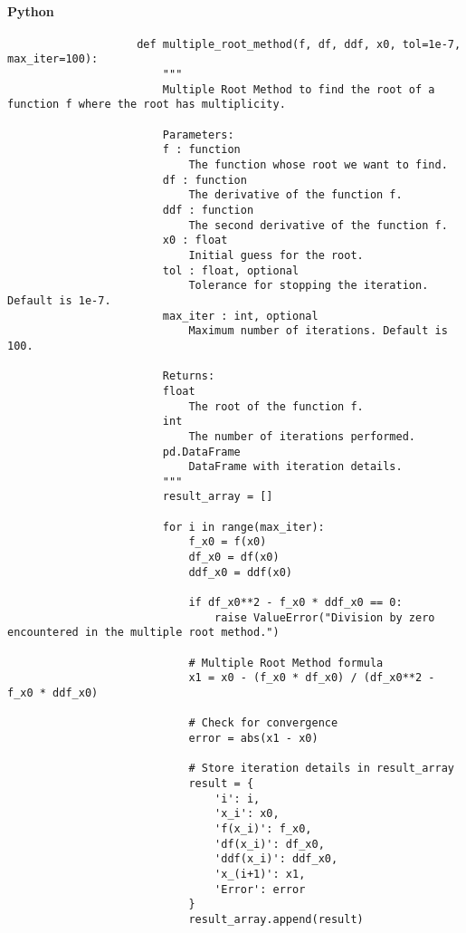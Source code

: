 \documentclass{article}
\begin{document}
            \paragraph{Python}
                \begin{verbatim}
                    def multiple_root_method(f, df, ddf, x0, tol=1e-7, max_iter=100):
                        """
                        Multiple Root Method to find the root of a function f where the root has multiplicity.

                        Parameters:
                        f : function
                            The function whose root we want to find.
                        df : function
                            The derivative of the function f.
                        ddf : function
                            The second derivative of the function f.
                        x0 : float
                            Initial guess for the root.
                        tol : float, optional
                            Tolerance for stopping the iteration. Default is 1e-7.
                        max_iter : int, optional
                            Maximum number of iterations. Default is 100.

                        Returns:
                        float
                            The root of the function f.
                        int
                            The number of iterations performed.
                        pd.DataFrame
                            DataFrame with iteration details.
                        """
                        result_array = []

                        for i in range(max_iter):
                            f_x0 = f(x0)
                            df_x0 = df(x0)
                            ddf_x0 = ddf(x0)

                            if df_x0**2 - f_x0 * ddf_x0 == 0:
                                raise ValueError("Division by zero encountered in the multiple root method.")

                            # Multiple Root Method formula
                            x1 = x0 - (f_x0 * df_x0) / (df_x0**2 - f_x0 * ddf_x0)

                            # Check for convergence
                            error = abs(x1 - x0)

                            # Store iteration details in result_array
                            result = {
                                'i': i,
                                'x_i': x0,
                                'f(x_i)': f_x0,
                                'df(x_i)': df_x0,
                                'ddf(x_i)': ddf_x0,
                                'x_(i+1)': x1,
                                'Error': error
                            }
                            result_array.append(result)


\end{verbatim}
\end{document}

